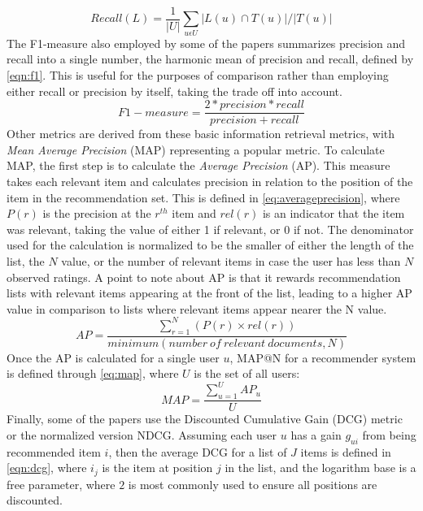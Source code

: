 \begin{equation}
    \label{eqn:recall}
    Recall(L) = \frac{1}{|U|} \sum\limits_{u \epsilon U} |L(u) \cap T(u)| / |T(u)|
\end{equation}
The F1-measure also employed by some of the papers summarizes precision and recall into a single number, the harmonic mean of precision and recall, defined by \autoref{eqn:f1}.
This is useful for the purposes of comparison rather than employing either recall or precision by itself, taking the trade off into account.
\begin{equation}
    \label{eqn:f1}
    F1-measure = \frac{2*precision*recall}{precision+recall}
\end{equation}
Other metrics are derived from these basic information retrieval metrics, with \textit{Mean Average Precision} (MAP) representing a popular metric\cite{ChoosingMetricsEvaluation}.
To calculate MAP, the first step is to calculate the \textit{Average Precision} (AP).
This measure takes each relevant item and calculates precision in relation to the position of the item in the recommendation set.
This is defined in \autoref{eq:averageprecision}, where $P(r)$ is the precision at the $r^{th}$ item and $rel(r)$ is an indicator that the item was relevant, taking the value of either 1 if relevant, or 0 if not.
The denominator used for the calculation is normalized to be the smaller of either the length of the list, the $N$ value, or the number of relevant items in case the user has less than $N$ observed ratings.
A point to note about AP is that it rewards recommendation lists with relevant items appearing at the front of the list, leading to a higher AP value in comparison to lists where relevant items appear nearer the N value. 
\begin{equation}
    \label{eq:averageprecision}
    AP = \frac{\sum\limits_{r=1}^N (P(r) \times rel(r))}{minimum(number \: of \: relevant \: documents, N)}
\end{equation}
Once the AP is calculated for a single user $u$, MAP@N for a recommender system is defined through \autoref{eq:map}, where $U$ is the set of all users: 
\begin{equation}
    \label{eq:map}
    MAP = \frac{\sum\limits_{u=1}^U AP_u}{U}
\end{equation}
Finally, some of the papers use the Discounted Cumulative Gain (DCG) metric or the normalized version NDCG.
Assuming each user $u$ has a gain $g_{ui}$ from being recommended item $i$, then the average DCG for a list of $J$ items is defined in \autoref{eqn:dcg}, where $i_j$ is the item at position $j$ in the list, and the logarithm base is a free parameter, where $2$ is most commonly used to ensure all positions are discounted.
